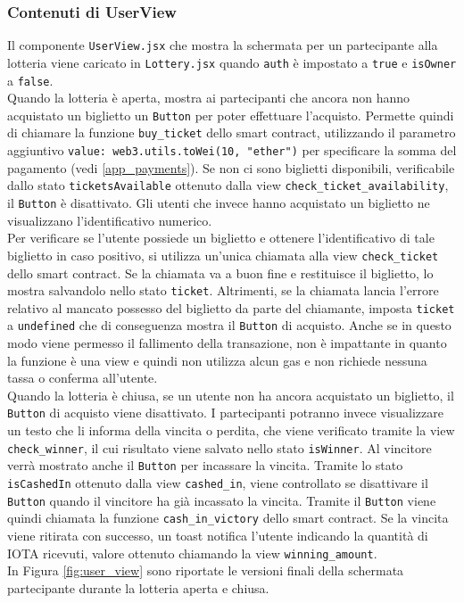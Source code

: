 \documentclass[12pt,a4paper,openright,twoside]{report}
\begin{document}
\subsubsection{Contenuti di UserView}
Il componente \texttt{UserView.jsx} che mostra la schermata per un partecipante alla lotteria viene caricato in \texttt{Lottery.jsx} quando \texttt{auth} è impostato a \texttt{true} e \texttt{isOwner} a \texttt{false}.\\
\label{app_buy_ticket}Quando la lotteria è aperta, mostra ai partecipanti che ancora non hanno acquistato un biglietto un \texttt{Button} per poter effettuare l'acquisto. Permette quindi di chiamare la funzione \texttt{buy\_ticket} dello smart contract, utilizzando il parametro aggiuntivo \texttt{value: web3.utils.toWei(10, "ether")} per specificare la somma del pagamento (vedi \ref{app_payments}). Se non ci sono biglietti disponibili, verificabile dallo stato \texttt{ticketsAvailable} ottenuto dalla view \texttt{check\_ticket\_availability}, il \texttt{Button} è disattivato. Gli utenti che invece hanno acquistato un biglietto ne visualizzano l'identificativo numerico.\\
Per verificare se l'utente possiede un biglietto e ottenere l'identificativo di tale biglietto in caso positivo, si utilizza un'unica chiamata alla view \texttt{check\_ticket} dello smart contract. Se la chiamata va a buon fine e restituisce il biglietto, lo mostra salvandolo nello stato \texttt{ticket}. Altrimenti, se la chiamata lancia l'errore relativo al mancato possesso del biglietto da parte del chiamante, imposta \texttt{ticket} a \texttt{undefined} che di conseguenza mostra il \texttt{Button} di acquisto. Anche se in questo modo viene permesso il fallimento della transazione, non è impattante in quanto la funzione è una view e quindi non utilizza alcun gas e non richiede nessuna tassa o conferma all'utente.\\
Quando la lotteria è chiusa, se un utente non ha ancora acquistato un biglietto, il \texttt{Button} di acquisto viene disattivato. I partecipanti potranno invece visualizzare un testo che li informa della vincita o perdita, che viene verificato tramite la view \texttt{check\_winner}, il cui risultato viene salvato nello stato \texttt{isWinner}. Al vincitore verrà mostrato anche il \texttt{Button} per incassare la vincita. Tramite lo stato \texttt{isCashedIn} ottenuto dalla view \texttt{cashed\_in}, viene controllato se disattivare il \texttt{Button} quando il vincitore ha già incassato la vincita. Tramite il \texttt{Button} viene quindi chiamata la funzione \texttt{cash\_in\_victory} dello smart contract. Se la vincita viene ritirata con successo, un toast notifica l'utente indicando la quantità di IOTA ricevuti, valore ottenuto chiamando la view \texttt{winning\_amount}.\\
In Figura \ref{fig:user_view} sono riportate le versioni finali della schermata partecipante durante la lotteria aperta e chiusa.
\end{document}
